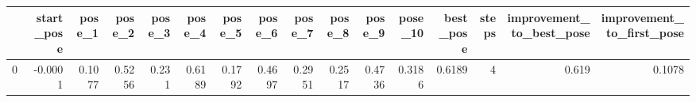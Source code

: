 \begin{tabular}{lrrrrrrrrrrrrrrr}
\toprule
{} &  start\_pose &  pose\_1 &  pose\_2 &  pose\_3 &  pose\_4 &  pose\_5 &  pose\_6 &  pose\_7 &  pose\_8 &  pose\_9 &  pose\_10 &  best\_pose &  steps &  improvement\_to\_best\_pose &  improvement\_to\_first\_pose \\
\midrule
0 &     -0.0001 &  0.1077 &  0.5256 &   0.231 &  0.6189 &  0.1792 &  0.4697 &  0.2951 &  0.2517 &  0.4736 &   0.3186 &     0.6189 &      4 &                     0.619 &                     0.1078 \\
\bottomrule
\end{tabular}
